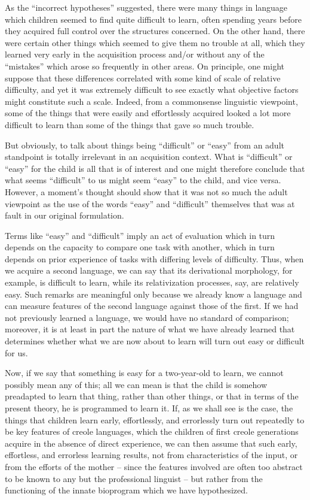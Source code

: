 As the ``incorrect hypotheses'' suggested, there were many things in language which children seemed to find quite difficult to learn, often spending years before they acquired full control over the structures concerned. On the other hand, there were certain other things which seemed to give them no trouble at all, which they learned very early in the acquisition process and/or without any of the ``mistakes'' which arose so frequently in other areas. On principle, one might suppose that these differences correlated with some kind of scale of relative difficulty, and yet it was extremely difficult to see exactly what objective factors might constitute such a scale. Indeed, from a commonsense linguistic viewpoint, some of the things that were easily and effortlessly acquired looked a lot more difficult to learn than some of the things that gave so much trouble.

But obviously, to talk about things being ``difficult'' or ``easy'' from an adult standpoint is totally irrelevant in an acquisition context. What is ``difficult'' or ``easy'' for the child is all that is of interest and one might therefore conclude that what seems ``difficult'' to us might seem ``easy'' to the child, and vice versa. However, a moment's
thought should show that it was not so much the adult viewpoint as the use of the words ``easy'' and ``difficult'' themselves that was at fault in our original formulation.

Terms like ``easy'' and ``difficult'' imply an act of evaluation which in turn depends on the capacity to compare one task with another, which in turn depends on prior experience of tasks with differing levels of difficulty. Thus, when we acquire a second language, we can say that its derivational morphology, for example, is difficult to learn, while its relativization processes, say, are relatively easy. Such remarks are meaningful only because we already know a language and can measure features of the second language against those of the first. If we had not previously learned a language, we would have no standard of comparison; moreover, it is at least in part the nature of what we have already learned that determines whether what we are now about to learn will turn out easy or difficult for us.

Now, if we say that something is easy for a two-year-old to learn, we cannot possibly mean any of this; all we can mean is that the child is somehow preadapted to learn that thing, rather than other things, or that in terms of the present theory, he is programmed to learn it. If, as we shall see is the case, the things that children learn early, effortlessly, and errorlessly turn out repeatedly to be key features of creole languages, which the children of first creole generations acquire in the absence of direct experience, we can then assume that such early, effortless, and errorless learning results, not from characteristics of the input, or from the efforts of the mother -- since the features involved are often too abstract to be known to any but the professional linguist -- but rather from the functioning of the innate bioprogram which we have hypothesized.

